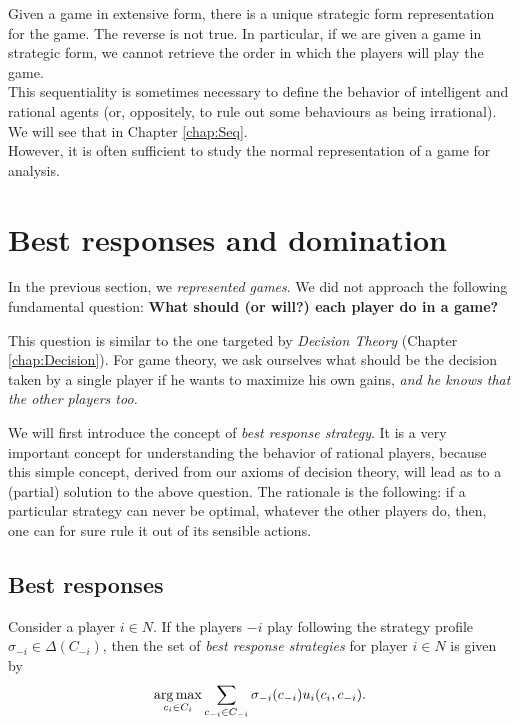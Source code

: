 Given a game in extensive form, there is a unique strategic form representation for the game. The reverse is not true. In particular, if we are given a game in strategic form, we cannot retrieve the order in which the players will play the game.\\
This sequentiality is sometimes necessary to define the behavior of intelligent and rational agents (or, oppositely, to rule out some behaviours as being irrational).  We will see that in Chapter \ref{chap:Seq}. \\
However, it is often sufficient to study the normal representation of a game for analysis.

\section{Best responses and domination}

In the previous section, we \emph{represented games}. We did not approach the following fundamental question:
 \textbf{What should (or will?) each player do in a game?}

This question is similar to the one targeted by \emph{Decision Theory} (Chapter \ref{chap:Decision}).
For game theory, we ask ourselves what should be the decision taken by a single player if he wants to maximize his own gains, \emph{and he knows that the other players too.}



We will first introduce the concept of \emph{best response strategy}. It is a very important concept for understanding the behavior of rational players, because this simple concept, derived from our axioms of decision theory, will lead as to a (partial) solution to the above question. The rationale is the following: if a particular strategy can never be optimal, whatever the other players do, then, one can for sure rule it out of its sensible actions.



\subsection{Best responses}
\label{chap2:subsec:BR}

\begin{definition}
Consider a player $i \in N$. If the players $-i$ play following the strategy profile $\sigma_{-i} \in \Delta(C_{-i})$, then the set of \emph{best response strategies} for player $i \in N$ is given by
$$ \operatorname*{arg\,max}_{c_i \in C_i} \sum_{c_{-i} \in C_{-i}} \sigma_{-i}(c_{-i}) u_i(c_i, c_{-i}).$$
\end{definition}

